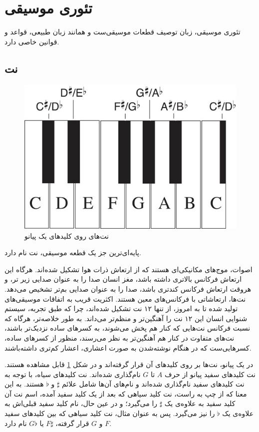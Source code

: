 \section{تئوری موسیقی}

تئوری موسیقی، زبان توصیف قطعات موسیقی‌ست و همانند زبان طبیعی، قواعد و قوانین خاصی دارد.

\subsection{نت}

\begin{figure}
	\centering
	\includegraphics[scale=0.4]{figures/pianokeys.jpg}
	\caption {
	نت‌های روی کلیدهای یک پیانو
	}
	\label{fig:pianokeys}
\end{figure}


پایه‌ای‌ترین جز یک قطعه موسیقی، نت
نام دارد. 

اصوات، موج‌های مکانیکی‌ای هستند که از ارتعاش ذرات هوا تشکیل شده‌اند. هرگاه این ارتعاش فرکانس بالاتری داشته باشد، مغز انسان صدا را به عنوان صدایی زیر تر، و هروقت ارتعاش فرکانس کندتری باشد، صدا را به عنوان صدایی بم‌تر تشخیص می‌دهد.
نت‌ها، ارتعاشاتی با فرکانس‌های معین هستند. اکثریت قریب به اتفاقات موسیقی‌های تولید شده تا به امروز، از تنها ۱۲ نت تشکیل شده‌اند، چرا که طبق تجربه، سیستم شنوایی انسان این ۱۲ نت را آهنگین‌تر و منظم‌تر می‌داند.
به طور خلاصه‌تر،  هرگاه که نسبت فرکانس نت‌هایی که  کنار هم پخش می‌شوند، به کسرهای ساده نزدیک‌تر باشند، نت‌های متفاوت در کنار هم آهنگین‌تر به نظر می‌رسند، منظور از کسرهای ساده، کسرهایی‌ست که در هنگام نوشته‌شدن به صورت اعشاری، اعشار کم‌تری داشته‌باشند.

در یک پیانو، نت‌ها بر روی کلیدهای آن قرار گرفته‌اند و در شکل
\ref{fig:pianokeys}
قابل مشاهده هستند.
نت کلیدهای سفید پیانو از حرف 
$A$
تا
$G$
نام‌گذاری شده‌اند. 
نت کلیدهای سیاه، با توجه به نت کلیدهای سفید نام‌گذاری شده‌اند و نام‌های آن‌ها شامل علائم
$\sharp$
و
$\flat$
هستند. 
به این معنا که از چپ به راست، نت کلید سیاهی که بعد از یک کلید سفید آمده، اسم نت آن کلید سفید به علاوه‌ی یک
$\sharp$
را می‌گیرد؛ و در عین حال، نام کلید سفید قبلی‌اش به علاوه‌ی یک
$\flat$
را نیز می‌گیرد. پس به عنوان مثال، نت کلید سیاهی که بین کلیدهای سفید 
$F$
و 
$G$
قرار گرفته، 
$F\sharp$
یا
$G\flat$
نام دارد.

